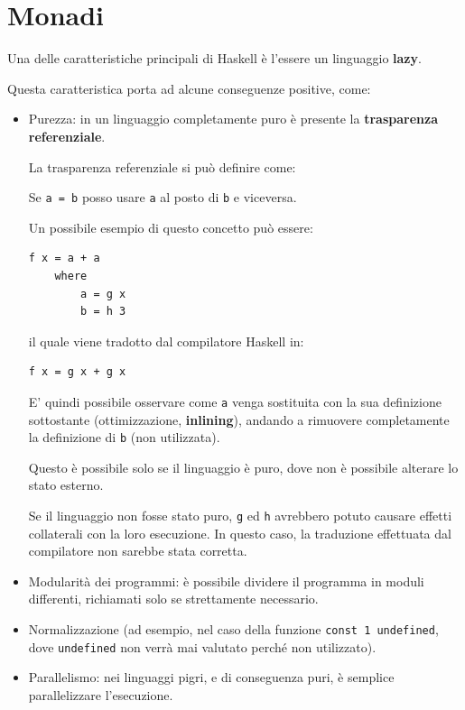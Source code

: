 \documentclass{article}
\begin{document}
\pagestyle{empty}

\section*{Monadi}
\large

Una delle caratteristiche principali di Haskell è l'essere un linguaggio \textbf{lazy}.

Questa caratteristica porta ad alcune conseguenze positive, come:
\begin{itemize}
    \item Purezza: in un linguaggio completamente puro è presente la \textbf{trasparenza referenziale}.
    
    La trasparenza referenziale si può definire come: 
    
    \begin{center}
        Se \texttt{a = b} posso usare \texttt{a} al posto di \texttt{b} e viceversa.
    \end{center}

    Un possibile esempio di questo concetto può essere:
\begin{tcolorbox}
\begin{verbatim}
f x = a + a
    where
        a = g x
        b = h 3
\end{verbatim}
\end{tcolorbox}

    il quale viene tradotto dal compilatore Haskell in:
\begin{tcolorbox}
\begin{verbatim}
f x = g x + g x
\end{verbatim}
\end{tcolorbox}

    E' quindi possibile osservare come \texttt{a} venga sostituita con la sua definizione sottostante (ottimizzazione, \textbf{inlining}), andando a rimuovere completamente la definizione di \texttt{b} (non utilizzata).

    Questo è possibile solo se il linguaggio è puro, dove non è possibile alterare lo stato esterno.

    Se il linguaggio non fosse stato puro, \texttt{g} ed \texttt{h} avrebbero potuto causare effetti collaterali con la loro esecuzione. In questo caso, la traduzione effettuata dal compilatore non sarebbe stata corretta.
    \item Modularità dei programmi: è possibile dividere il programma in moduli differenti, richiamati solo se strettamente necessario.
    \item Normalizzazione (ad esempio, nel caso della funzione \texttt{const 1 undefined}, dove \texttt{undefined} non verrà mai valutato perché non utilizzato).
    \item Parallelismo: nei linguaggi pigri, e di conseguenza puri, è semplice parallelizzare l'esecuzione.
\end{itemize}
\end{document}
